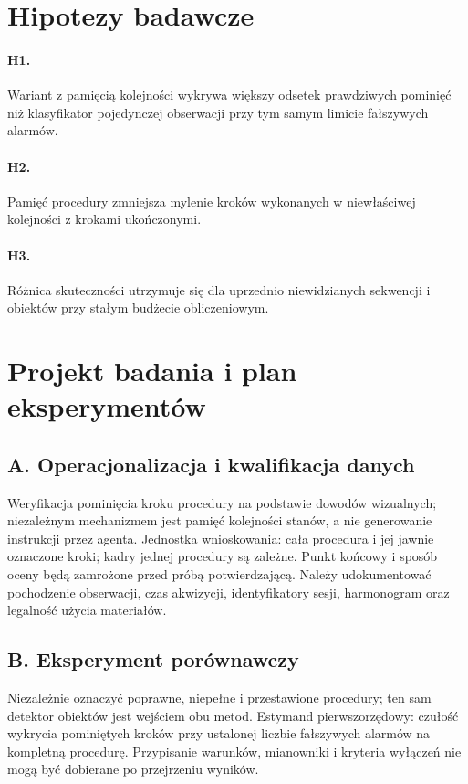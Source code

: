 \documentclass[11pt,a4paper]{article}
\begin{document}
\section{Hipotezy badawcze}
\paragraph{H1.} Wariant z pamięcią kolejności wykrywa większy odsetek prawdziwych pominięć niż klasyfikator pojedynczej obserwacji przy tym samym limicie fałszywych alarmów.
\paragraph{H2.} Pamięć procedury zmniejsza mylenie kroków wykonanych w niewłaściwej kolejności z krokami ukończonymi.
\paragraph{H3.} Różnica skuteczności utrzymuje się dla uprzednio niewidzianych sekwencji i obiektów przy stałym budżecie obliczeniowym.

\section{Projekt badania i plan eksperymentów}
\subsection{A. Operacjonalizacja i kwalifikacja danych}
Weryfikacja pominięcia kroku procedury na podstawie dowodów wizualnych; niezależnym mechanizmem jest pamięć kolejności stanów, a nie generowanie instrukcji przez agenta. Jednostka wnioskowania: cała procedura i jej jawnie oznaczone kroki; kadry jednej procedury są zależne. Punkt końcowy i sposób oceny będą zamrożone przed próbą potwierdzającą. Należy udokumentować pochodzenie obserwacji, czas akwizycji, identyfikatory sesji, harmonogram oraz legalność użycia materiałów.

\subsection{B. Eksperyment porównawczy}
Niezależnie oznaczyć poprawne, niepełne i przestawione procedury; ten sam detektor obiektów jest wejściem obu metod. Estymand pierwszorzędowy: czułość wykrycia pominiętych kroków przy ustalonej liczbie fałszywych alarmów na kompletną procedurę. Przypisanie warunków, mianowniki i kryteria wyłączeń nie mogą być dobierane po przejrzeniu wyników.
\end{document}
